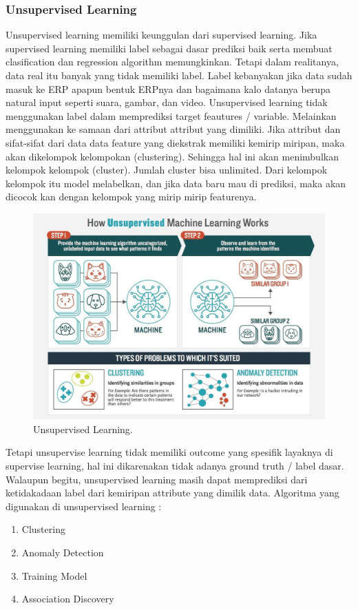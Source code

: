 \subsubsection{Unsupervised Learning}
\hfill\break
Unsupervised learning memiliki keunggulan dari supervised learning. Jika supervised learning memiliki label sebagai dasar prediksi baik serta membuat clasification dan regression algorithm memungkinkan. Tetapi dalam realitanya, data real itu banyak yang tidak memiliki label. Label kebanyakan jika data sudah masuk ke ERP apapun bentuk ERPnya dan bagaimana kalo datanya berupa natural input seperti suara, gambar, dan video. Unsupervised learning tidak menggunakan label dalam memprediksi target feautures / variable. Melainkan menggunakan ke samaan dari attribut attribut yang dimiliki. Jika attribut dan sifat-sifat dari data data feature yang diekstrak memiliki kemirip miripan, maka akan dikelompok kelompokan (clustering). Sehingga hal ini akan menimbulkan kelompok kelompok (cluster). Jumlah cluster bisa unlimited. Dari kelompok kelompok itu model melabelkan, dan jika data baru mau di prediksi, maka akan dicocok kan dengan kelompok yang mirip mirip featurenya.
\begin{figure}[H]
	\includegraphics[width=1\textwidth]{figures/1184077/chapter1/unsupervisedlearning.jpg}
	\centering
	\caption{Unsupervised Learning.}
\end{figure}
\noindent
Tetapi unsupervise learning tidak memiliki outcome yang spesifik layaknya di supervise learning, hal ini dikarenakan tidak adanya ground truth / label dasar. Walaupun begitu, unsupervised learning masih dapat memprediksi dari ketidakadaan label dari kemiripan attribute yang dimilik data.
\noindent
Algoritma yang digunakan di unsupervised learning :
\begin{enumerate}
	\item Clustering
    \item Anomaly Detection
    \item Training Model
    \item Association Discovery
\end{enumerate}
